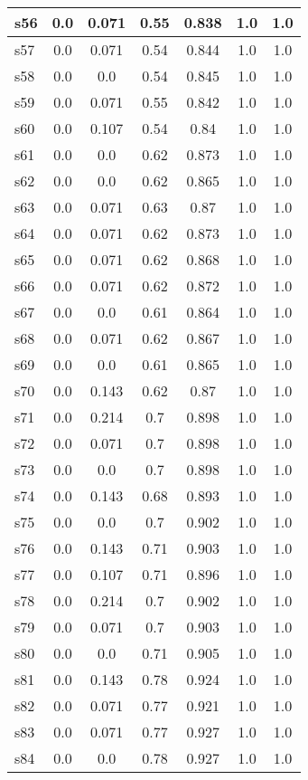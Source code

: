 \documentclass{article}
\begin{document}
\begin{tabular}{|l|c|c|c|c|c|c|}
\hline
s56 &0.0 & 0.071 & 0.55 & 0.838 & 1.0 & 1.0\\
\hline
s57 &0.0 & 0.071 & 0.54 & 0.844 & 1.0 & 1.0\\
\hline
s58 &0.0 & 0.0 & 0.54 & 0.845 & 1.0 & 1.0\\
\hline
s59 &0.0 & 0.071 & 0.55 & 0.842 & 1.0 & 1.0\\
\hline
s60 &0.0 & 0.107 & 0.54 & 0.84 & 1.0 & 1.0\\
\hline
s61 &0.0 & 0.0 & 0.62 & 0.873 & 1.0 & 1.0\\
\hline
s62 &0.0 & 0.0 & 0.62 & 0.865 & 1.0 & 1.0\\
\hline
s63 &0.0 & 0.071 & 0.63 & 0.87 & 1.0 & 1.0\\
\hline
s64 &0.0 & 0.071 & 0.62 & 0.873 & 1.0 & 1.0\\
\hline
s65 &0.0 & 0.071 & 0.62 & 0.868 & 1.0 & 1.0\\
\hline
s66 &0.0 & 0.071 & 0.62 & 0.872 & 1.0 & 1.0\\
\hline
s67 &0.0 & 0.0 & 0.61 & 0.864 & 1.0 & 1.0\\
\hline
s68 &0.0 & 0.071 & 0.62 & 0.867 & 1.0 & 1.0\\
\hline
s69 &0.0 & 0.0 & 0.61 & 0.865 & 1.0 & 1.0\\
\hline
s70 &0.0 & 0.143 & 0.62 & 0.87 & 1.0 & 1.0\\
\hline
s71 &0.0 & 0.214 & 0.7 & 0.898 & 1.0 & 1.0\\
\hline
s72 &0.0 & 0.071 & 0.7 & 0.898 & 1.0 & 1.0\\
\hline
s73 &0.0 & 0.0 & 0.7 & 0.898 & 1.0 & 1.0\\
\hline
s74 &0.0 & 0.143 & 0.68 & 0.893 & 1.0 & 1.0\\
\hline
s75 &0.0 & 0.0 & 0.7 & 0.902 & 1.0 & 1.0\\
\hline
s76 &0.0 & 0.143 & 0.71 & 0.903 & 1.0 & 1.0\\
\hline
s77 &0.0 & 0.107 & 0.71 & 0.896 & 1.0 & 1.0\\
\hline
s78 &0.0 & 0.214 & 0.7 & 0.902 & 1.0 & 1.0\\
\hline
s79 &0.0 & 0.071 & 0.7 & 0.903 & 1.0 & 1.0\\
\hline
s80 &0.0 & 0.0 & 0.71 & 0.905 & 1.0 & 1.0\\
\hline
s81 &0.0 & 0.143 & 0.78 & 0.924 & 1.0 & 1.0\\
\hline
s82 &0.0 & 0.071 & 0.77 & 0.921 & 1.0 & 1.0\\
\hline
s83 &0.0 & 0.071 & 0.77 & 0.927 & 1.0 & 1.0\\
\hline
s84 &0.0 & 0.0 & 0.78 & 0.927 & 1.0 & 1.0\\

\end{tabular}
\end{document}
